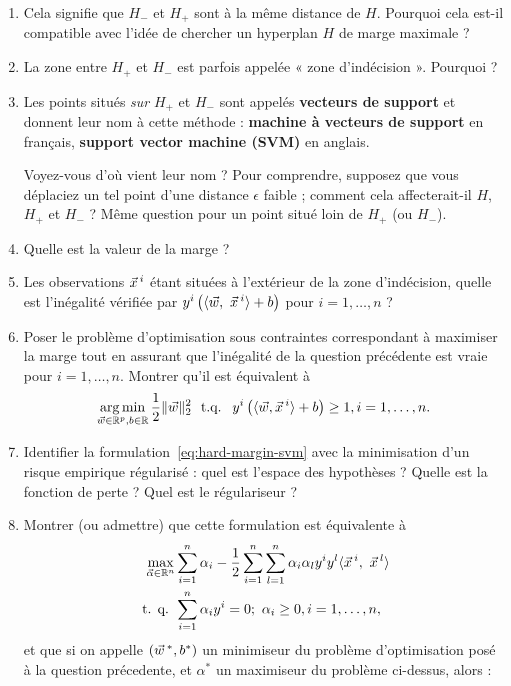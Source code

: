 \documentclass[french,11pt]{article}
\begin{document}
\begin{enumerate}[resume]
\item Cela signifie que $H_-$ et $H_+$ sont à la même distance de $H$. Pourquoi
  cela est-il compatible avec l'idée de chercher un hyperplan $H$ de marge
  maximale ? 
\item La zone entre $H_+$ et $H_-$ est parfois appelée « zone d'indécision ». Pourquoi ?
\item Les points situés \textit{sur}  $H_+$ et $H_-$ sont appelés \textbf{vecteurs de support} et donnent leur nom à cette méthode : \textbf{machine à vecteurs de support} en français, \textbf{support vector machine (SVM)} en anglais.

  Voyez-vous d'où vient leur nom ?  Pour comprendre, supposez que vous
  déplaciez un tel point d'une distance $\epsilon$ faible ; comment cela
  affecterait-il $H$, $H_+$ et $H_-$ ? Même question pour un point situé loin
  de $H_+$ (ou $H_-$).
\item Quelle est la valeur de la marge ?
\item Les observations $\xx^i$ étant situées à l'extérieur de la zone
  d'indécision, quelle est l'inégalité vérifiée par
  $y^i \left(\innerproduct{\ww,~\xx^i} + b \right)$ pour $i=1, \dots, n$ ?
\item Poser le problème d'optimisation sous contraintes correspondant à maximiser la marge tout en assurant que l'inégalité de la question précédente est vraie pour $i=1, \dots, n$.
Montrer qu'il est équivalent à 
\begin{equation}
  \label{eq:hard-margin-svm}
    \argmin_{\ww \in \RR^p, b \in \RR} \frac{1}{2} \ltwonorm{\ww}^2 \text{ ~t.q.~ } 
    y^i \left(\innerproduct{\ww, \xx^i} + b \right)\geq 1, i=1, \dots, n.
  \end{equation} 
\item Identifier la formulation~\eqref{eq:hard-margin-svm} avec la minimisation d'un risque empirique régularisé : quel est l'espace des hypothèses ? Quelle est la fonction de perte ? Quel est le régulariseur ?
\item Montrer (ou admettre) que cette formulation est équivalente à
  \begin{align*}
    \max_{\aalpha \in \RR^n} & 
                               \sum_{i=1}^n  \alpha_i- \frac{1}{2} \sum_{i=1}^n \sum_{l=1}^n \alpha_i \alpha_l y^i y^l \innerproduct{\xx^i,~\xx^l} \\
    \nonumber \text{ t. q. }  & \sum_{i=1}^n \alpha_i y^i = 0;\,\, \alpha_i \geq 0,
                                i=1, \dots, n,
  \end{align*}
  et que si on appelle $(\ww^*, b^*)$ un minimiseur du problème d'optimisation
  posé à la question précedente, et $\alpha^*$ un maximiseur du problème
  ci-dessus, alors :


\end{enumerate}
\end{document}
